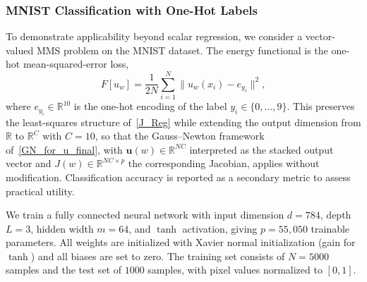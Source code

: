 \documentclass[twoside,11pt]{article}
\begin{document}
\begin{table}[t]
\centering
\caption{
Comparison of optimizers on the 10D regression benchmark with a wider network
(1537 parameters, $n_{\text{train}}=1000$).
Each entry reports the final value after the MMS iteration. CPU time is measured in seconds on a MacBook Pro with an Apple M2 chip.}
\label{tab:optimizer-10d-wide}
\end{table}

\subsubsection{MNIST Classification with One-Hot Labels}

To demonstrate applicability beyond scalar regression, we consider 
a vector-valued MMS problem on the MNIST dataset. The energy 
functional is the one-hot mean-squared-error loss,
\begin{equation}
    F[u_w] = \frac{1}{2N}\sum_{i=1}^{N} 
    \|u_w(x_i) - e_{y_i}\|^2,
\end{equation}
where $e_{y_i} \in \mathbb{R}^{10}$ is the one-hot encoding of the 
label $y_i \in \{0,\ldots,9\}$. This preserves the least-squares 
structure of~\eqref{J_Reg} while extending the output dimension 
from $\mathbb{R}$ to $\mathbb{R}^C$ with $C = 10$, so that the Gauss--Newton framework of~\eqref{GN_for_u_final}, with $\mathbf{u}(w)\in\mathbb{R}^{NC}$ interpreted as the stacked output vector and $J(w)\in\mathbb{R}^{NC\times p}$ the corresponding Jacobian, applies without modification.
Classification accuracy is reported as a secondary metric to
assess practical utility.

We train a fully connected neural network with input dimension 
$d = 784$, depth $L = 3$, hidden width $m = 64$, and $\tanh$ 
activation, giving $p = 55{,}050$ trainable parameters. All weights 
are initialized with Xavier normal initialization (gain for $\tanh$) 
and all biases are set to zero. The training set consists of 
$N = 5000$ samples and the test set of $1000$ samples, with pixel 
values normalized to $[0, 1]$.
\end{document}
